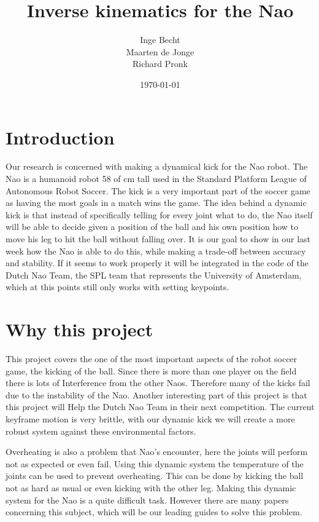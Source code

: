 \documentclass[a4paper]{article}
\begin{document}
\title{Inverse kinematics for the Nao}
\author{Inge Becht \\ Maarten de Jonge \\ Richard Pronk}
\date{\today}
\maketitle

\section{Introduction}
Our research is concerned with making a dynamical kick for the Nao robot. The
Nao is a humanoid robot 58 of cm tall used in the Standard Platform League of
Autonomous Robot Soccer. The kick is a very important part of the soccer game as
having the most goals in a match wins the game. The idea behind a dynamic kick
is that instead of specifically telling for every joint what to do, the Nao
itself will be able to decide given a position of the ball and his own position
how to move his leg to hit the ball without falling over. It is our goal to show
in our last week how the Nao is able to do this, while making a trade-off
between accuracy and stability. If it seems to work properly it will be
integrated in the code of the Dutch Nao Team, the SPL team that represents the
University of Amsterdam, which at this points still only works with setting
keypoints.

\section{Why this project} 
This project covers the one of the most important aspects of the robot soccer
game, the kicking of the ball. Since there is more than one player on the field
there is lots of Interference from the other Naos. Therefore many of the kicks
fail due to the instability of the Nao. Another interesting part of this project
is that this project will Help the Dutch Nao Team in their next competition. The
current keyframe motion is very brittle, with our dynamic kick we will create a
more robust system against these environmental factors.

Overheating is also a problem that Nao’s encounter, here the joints will perform
not as expected or even fail. Using this dynamic system the temperature of the
joints can be used to prevent overheating. This can be done by kicking the ball
not as hard as usual or even kicking with the other leg. Making this dynamic
system for the Nao is a quite difficult task. However there are many papers
concerning this subject, which will be our leading guides to solve this problem. 
\end{document}
